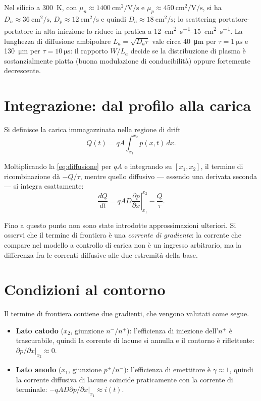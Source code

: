 \documentclass[11pt,a4paper]{article}
\newcommand{\dpar}[2]{\frac{\partial #1}{\partial #2}}
\begin{document}
Nel silicio a \SI{300}{\kelvin}, con $\mu_n \approx \SI{1400}{\centi\meter\squared\per\volt\per\second}$
e $\mu_p \approx \SI{450}{\centi\meter\squared\per\volt\per\second}$, si ha
$D_n \approx \SI{36}{\centi\meter\squared\per\second}$,
$D_p \approx \SI{12}{\centi\meter\squared\per\second}$ e quindi
$D_a \approx \SI{18}{\centi\meter\squared\per\second}$; lo scattering portatore-portatore
in alta iniezione lo riduce in pratica a \SIrange{12}{15}{\centi\meter\squared\per\second}.
La lunghezza di diffusione ambipolare $L_a = \sqrt{D_a \tau}$ vale circa
\SI{40}{\micro\meter} per $\tau = \SI{1}{\micro\second}$ e \SI{130}{\micro\meter} per
$\tau = \SI{10}{\micro\second}$: il rapporto $W/L_a$ decide se la distribuzione di
plasma \`e sostanzialmente piatta (buona modulazione di conducibilit\`a) oppure
fortemente decrescente.

\section{Integrazione: dal profilo alla carica}

Si definisce la carica immagazzinata nella regione di drift
\begin{equation}
  Q(t) = qA \int_{x_1}^{x_2} p(x,t)\, dx .
\end{equation}

Moltiplicando la \eqref{eq:diffusione} per $qA$ e integrando su $[x_1,x_2]$, il termine
di ricombinazione d\`a $-Q/\tau$, mentre quello diffusivo --- essendo una derivata
seconda --- si integra esattamente:
\begin{equation}
  \frac{dQ}{dt}
  = qAD \left.\dpar{p}{x}\right|_{x_1}^{x_2} - \frac{Q}{\tau}.
  \label{eq:integrata}
\end{equation}

Fino a questo punto non sono state introdotte approssimazioni ulteriori. Si osservi
che il termine di frontiera \`e una \emph{corrente di gradiente}: la corrente che
compare nel modello a controllo di carica non \`e un ingresso arbitrario, ma la
differenza fra le correnti diffusive alle due estremit\`a della base.

\section{Condizioni al contorno}

Il termine di frontiera contiene due gradienti, che vengono valutati come segue.

\begin{itemize}
  \item \textbf{Lato catodo} ($x_2$, giunzione $n^-/n^+$): l'efficienza di iniezione
        dell'$n^+$ \`e trascurabile, quindi la corrente di lacune si annulla e il
        contorno \`e riflettente:
        $\left.\partial p/\partial x\right|_{x_2} \approx 0$.
  \item \textbf{Lato anodo} ($x_1$, giunzione $p^+/n^-$): l'efficienza di emettitore
        \`e $\gamma \approx 1$, quindi la corrente diffusiva di lacune coincide
        praticamente con la corrente di terminale:
        $-qAD \left.\partial p/\partial x\right|_{x_1} \approx i(t)$.
\end{itemize}
\end{document}
